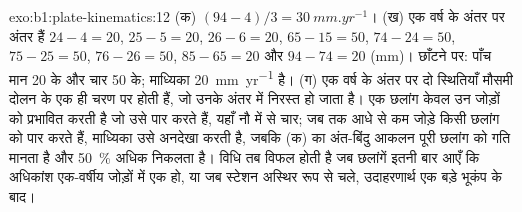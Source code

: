 \begin{solution}{exo:b1:plate-kinematics:12}
(क) $(94 - 4)/3 = \qty{30}{mm.yr^{-1}}$। (ख) एक वर्ष के अंतर पर अंतर हैं
$24 - 4 = 20$, $25 - 5 = 20$, $26 - 6 = 20$, $65 - 15 = 50$, $74 - 24 = 50$,
$75 - 25 = 50$, $76 - 26 = 50$, $85 - 65 = 20$ और $94 - 74 = 20$ (mm)। छाँटने पर:
पाँच मान 20 के और चार 50 के; माध्यिका \qty{20}{mm.yr^{-1}} है। (ग) एक वर्ष के अंतर पर दो स्थितियाँ मौसमी दोलन के एक ही चरण पर होती हैं, जो उनके अंतर में निरस्त हो जाता है। एक छलांग केवल उन जोड़ों को प्रभावित करती है जो उसे पार करते हैं, यहाँ नौ में से चार; जब तक आधे से कम जोड़े किसी छलांग को पार करते हैं, माध्यिका उसे अनदेखा करती है, जबकि (क) का अंत-बिंदु आकलन पूरी छलांग को गति मानता है और \qty{50}{\percent} अधिक निकलता है। विधि तब विफल होती है जब छलांगें इतनी बार आएँ कि अधिकांश एक-वर्षीय जोड़ों में एक हो, या जब स्टेशन अस्थिर रूप से चले, उदाहरणार्थ एक बड़े भूकंप के बाद।
\end{solution}

